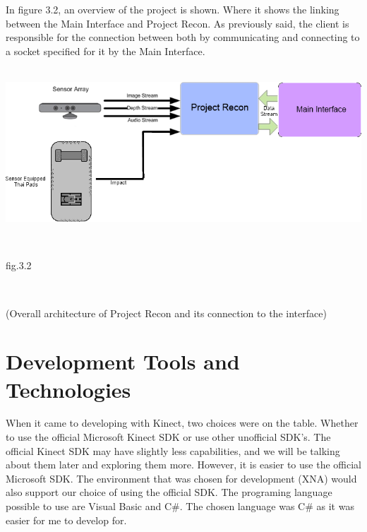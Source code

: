 In figure 3.2, an overview of the project is shown. Where it shows the linking between the Main Interface and Project Recon. As previously said, the client is responsible for the connection between both by communicating and connecting to a socket specified for it by the Main Interface.
\\
\\
\centerline{\includegraphics[scale=0.8]{general_overview.png}}
\\
\centerline{fig.3.2}
\\
\centerline{(Overall architecture of Project Recon and its connection to the interface)}

\section{Development Tools and Technologies}
When it came to developing with Kinect, two choices were on the table. Whether to use the official Microsoft Kinect SDK or use other unofficial SDK's. The official Kinect SDK may have slightly less capabilities, and we will be talking about them later and exploring them more. However, it is easier to use the official Microsoft SDK. The environment that was chosen for development (XNA) would also support our choice of using the official SDK. The programing language possible to use are Visual Basic and C\#. The chosen language was C\# as it was easier for me to develop for.


